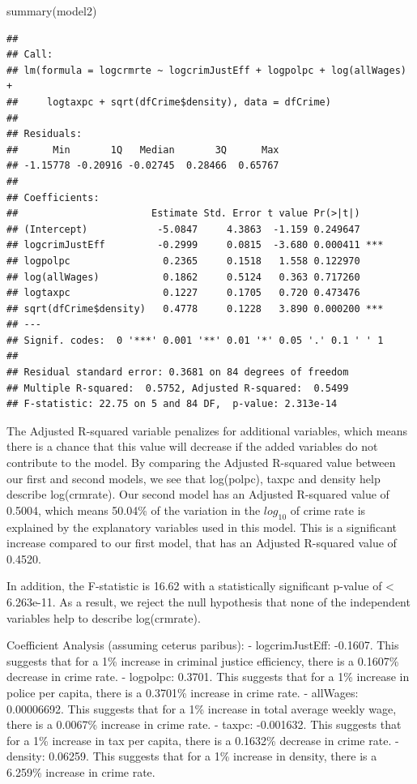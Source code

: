 \documentclass[]{article}
\newenvironment{Shaded}{}{}
\newcommand{\KeywordTok}[1]{\textcolor[rgb]{0.00,0.00,1.00}{#1}}
\newcommand{\NormalTok}[1]{#1}
\begin{document}
\begin{Shaded}
\begin{Highlighting}[]
\KeywordTok{summary}\NormalTok{(model2)}
\end{Highlighting}
\end{Shaded}

\begin{verbatim}
## 
## Call:
## lm(formula = logcrmrte ~ logcrimJustEff + logpolpc + log(allWages) + 
##     logtaxpc + sqrt(dfCrime$density), data = dfCrime)
## 
## Residuals:
##      Min       1Q   Median       3Q      Max 
## -1.15778 -0.20916 -0.02745  0.28466  0.65767 
## 
## Coefficients:
##                       Estimate Std. Error t value Pr(>|t|)    
## (Intercept)            -5.0847     4.3863  -1.159 0.249647    
## logcrimJustEff         -0.2999     0.0815  -3.680 0.000411 ***
## logpolpc                0.2365     0.1518   1.558 0.122970    
## log(allWages)           0.1862     0.5124   0.363 0.717260    
## logtaxpc                0.1227     0.1705   0.720 0.473476    
## sqrt(dfCrime$density)   0.4778     0.1228   3.890 0.000200 ***
## ---
## Signif. codes:  0 '***' 0.001 '**' 0.01 '*' 0.05 '.' 0.1 ' ' 1
## 
## Residual standard error: 0.3681 on 84 degrees of freedom
## Multiple R-squared:  0.5752, Adjusted R-squared:  0.5499 
## F-statistic: 22.75 on 5 and 84 DF,  p-value: 2.313e-14
\end{verbatim}

The Adjusted R-squared variable penalizes for additional variables,
which means there is a chance that this value will decrease if the added
variables do not contribute to the model. By comparing the Adjusted
R-squared value between our first and second models, we see that
log(polpc), taxpc and density help describe log(crmrate). Our second
model has an Adjusted R-squared value of 0.5004, which means 50.04\% of
the variation in the \(log_{10}\) of crime rate is explained by the
explanatory variables used in this model. This is a significant increase
compared to our first model, that has an Adjusted R-squared value of
0.4520.

In addition, the F-statistic is 16.62 with a statistically significant
p-value of \textless{} 6.263e-11. As a result, we reject the null
hypothesis that none of the independent variables help to describe
log(crmrate).

Coefficient Analysis (assuming ceterus paribus): - logcrimJustEff:
-0.1607. This suggests that for a 1\% increase in criminal justice
efficiency, there is a 0.1607\% decrease in crime rate. - logpolpc:
0.3701. This suggests that for a 1\% increase in police per capita,
there is a 0.3701\% increase in crime rate. - allWages: 0.00006692. This
suggests that for a 1\% increase in total average weekly wage, there is
a 0.0067\% increase in crime rate. - taxpc: -0.001632. This suggests
that for a 1\% increase in tax per capita, there is a 0.1632\% decrease
in crime rate. - density: 0.06259. This suggests that for a 1\% increase
in density, there is a 6.259\% increase in crime rate.
\end{document}

